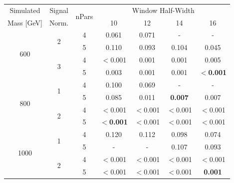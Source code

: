 \begin{table}[!ht]
\centering
\begin{tabular}{|c|c|c||c|c|c|c|}
\hline
      Simulated      & Signal             & \multirow{2}{*}{nPars} &\multicolumn{4}{c|}{Window Half-Width} \\ \cline{4-7} 
      Mass [GeV]     & Norm.     &                        &      10        &      12        &      14        &      16        \\ \hline
      \multirow{4}{*}{600}&       \multirow{2}{*}{2}              &           4            &   0.061    &   0.071    &     -      &     -      \\
                     &                           &           5            &   0.110    &   0.093    &   0.104    &   0.045    \\ \cline{2-7}
                     &            \multirow{2}{*}{3}              &           4            &   $<$0.001 &   0.001    &   0.001    &   0.005    \\
                     &                           &           5            &   0.003    &   0.001    &   0.001    &  \textbf{$<$0.001} \\ \hline
      \multirow{4}{*}{800}&       \multirow{2}{*}{1}              &           4            &   0.100    &   0.069    &     -      &     -      \\
                     &                           &           5            &   0.085    &   0.011    &   \textbf{0.007}    &   0.007    \\ \cline{2-7}
                     &            \multirow{2}{*}{2}              &           4            &   $<$0.001 &   $<$0.001 &   $<$0.001 &   $<$0.001  \\
                     &                           &           5            &   \textbf{$<$0.001} &   $<$0.001 &   $<$0.001 &   $<$0.001  \\ \hline
       \multirow{4}{*}{1000}&     \multirow{2}{*}{1}              &           4            &   0.120    &   0.112    &   0.098    &   0.074    \\
                     &                           &           5            &     -      &     -      &   0.107    &   0.093    \\ \cline{2-7}
                     &            \multirow{2}{*}{2}              &           4            &   $<$0.001 &   $<$0.001 &   $<$0.001 &   $<$0.001  \\
                     &                           &           5            &   $<$0.001 &   $<$0.001 &   $<$0.001 &   \textbf{0.001}    \\
\hline
\end{tabular}


\end{table}

